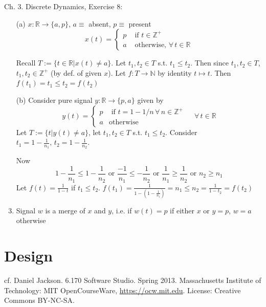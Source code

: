 \documentclass[10pt]{amsart}
\newcommand{\exercisehead}[1]
  { \smallskip
   \noindent{\small\bf Exercise #1.}
  }
\begin{document}
Ch. 3. Discrete Dynamics, Exercise 8:

\exercisehead{8} \begin{enumerate}
	\item[(a)] $x: \mathbb{R} \to \lbrace a, p \rbrace$, $a \equiv $ absent, $p \equiv$ present 
	\[
	x(t) = \begin{cases} p & \text{ if } t \in \mathbb{Z}^+ \\ 
	a & \text{ otherwise, } \forall \, t\in \mathbb{R} \end{cases}
	\]
	
	Recall $T:= \lbrace t\in \mathbb{R} | x(t) \neq a \rbrace$. Let $t_1, t_2 \in T$ s.t. $t_1 \leq t_2$. Then since $t_1, t_2 \in T$, $t_1, t_2 \in \mathbb{Z}^+$ (by def. of given $x$). Let $f:T \to \mathbb{N}$ by identity $t \mapsto t$. Then $f(t_1) = t_1 \leq t_2 = f(t_2)$
 	\item[(b)]  Consider pure signal $y : \mathbb{R} \to \lbrace p, a \rbrace$ given by 
 	\[
 	y(t) = \begin{cases} p  & \text{ if } t = 1 -1/n \, \forall \, n \in \mathbb{Z}^+ \\ 
 	a & \text{otherwise } \end{cases} \quad \, \forall \, t \in \mathbb{R} 
  	\]
  	Let $T := \lbrace t | y(t) \neq a \rbrace$, let $t_1, t_2 \in T$ s.t. $t_1 \leq t_2$. Consider $t_1 = 1 - \frac{1}{n_1}, \, t_2 =  1 - \frac{1}{n_2}$. 
  	
  	Now
  	\[
  		1 - \frac{1}{n_1} \leq 1 - \frac{1}{n_2} \text{ or } \frac{-1}{n_1} \leq -\frac{1}{n_2} \text{ or } \frac{1}{n_1} \geq \frac{1}{n_2} \text{ or } n_2 \geq n_1
  	\]
  	Let $f(t) = \frac{1}{1-t}$ if $t_1 \leq t_2$.  $f(t_1) = \frac{1}{ 1 - \left( 1 - \frac{1}{n_1} \right) } = n_1 \leq n_2  = \frac{1}{ 1 - t_2 } = f(t_2)$
	\item Signal $w$ is a merge of $x$ and $y$, i.e. if $w(t) = p$ if either $x$ or $y = p$, $w=a$ otherwise
\end{enumerate}

\part{Design}

cf. Daniel Jackson. 6.170 Software Studio. Spring 2013. Massachusetts Institute of Technology: MIT OpenCourseWare, \url{https://ocw.mit.edu}. License: Creative Commons BY-NC-SA.
\end{document}
